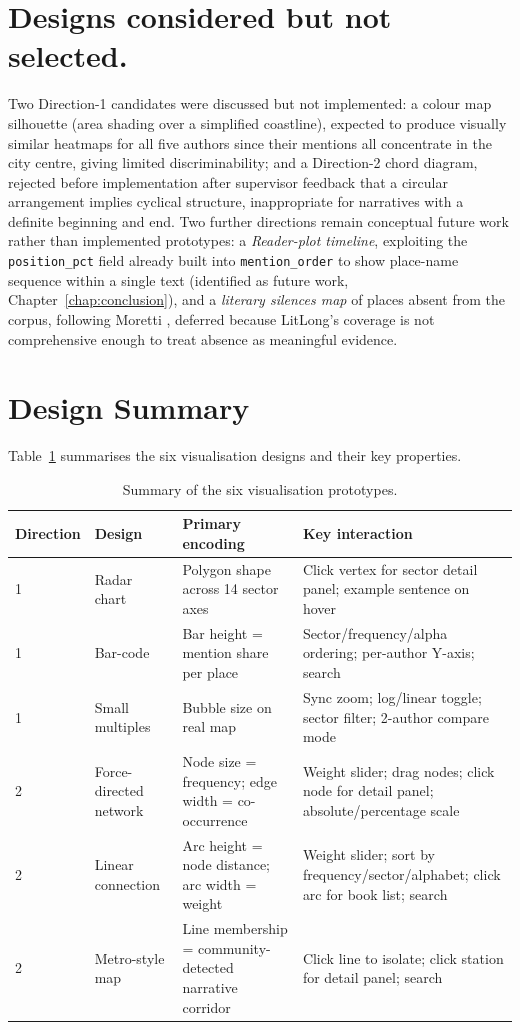 \documentclass[logo,msc]{infthesis}
\begin{document}
\section{Designs considered but not selected.} Two Direction-1 candidates were discussed but not implemented: a colour map silhouette (area shading over a simplified coastline), expected to produce visually similar heatmaps for all five authors since their mentions all concentrate in the city centre, giving limited discriminability; and a Direction-2 chord diagram, rejected before implementation after supervisor feedback that a circular arrangement implies cyclical structure, inappropriate for narratives with a definite beginning and end. Two further directions remain conceptual future work rather than implemented prototypes: a \emph{Reader-plot timeline}, exploiting the \texttt{position\_pct} field already built into \texttt{mention\_order} to show place-name sequence within a single text (identified as future work, Chapter~\ref{chap:conclusion}), and a \emph{literary silences map} of places absent from the corpus, following Moretti \cite{moretti2005}, deferred because LitLong's coverage is not comprehensive enough to treat absence as meaningful evidence.
 
\section{Design Summary}
 
Table~\ref{tab:design-summary} summarises the six visualisation designs and their key properties.
 
\begin{table}[h]
\centering
\caption{Summary of the six visualisation prototypes.}
\label{tab:design-summary}
\small
\begin{tabular}{llp{5cm}p{4cm}}
\toprule
Direction & Design & Primary encoding & Key interaction \\
\midrule
1 & Radar chart & Polygon shape across 14 sector axes & Click vertex for sector detail panel; example sentence on hover \\
1 & Bar-code & Bar height = mention share per place & Sector/frequency/alpha ordering; per-author Y-axis; search \\
1 & Small multiples & Bubble size on real map & Sync zoom; log/linear toggle; sector filter; 2-author compare mode \\
2 & Force-directed network & Node size = frequency; edge width = co-occurrence & Weight slider; drag nodes; click node for detail panel; absolute/percentage scale \\
2 & Linear connection & Arc height = node distance; arc width = weight & Weight slider; sort by frequency/sector/alphabet; click arc for book list; search \\
2 & Metro-style map & Line membership = community-detected narrative corridor & Click line to isolate; click station for detail panel; search \\
\bottomrule
\end{tabular}
\end{table}
 
\end{document}

